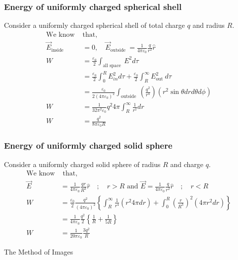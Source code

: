 \subsubsection{Energy of uniformly charged spherical shell}
Consider a uniformly charged spherical shell of total charge $q$ and radius $R$.
\begin{align*}
\text{We know }&\text{that,}\\
\vec{E}_{\text {inside }}&=0, \quad \vec{E}_{\text {outside }}=\frac{1}{4 \pi \varepsilon_{0}} \frac{q}{r^{2}} \hat{r}\\
W&=\frac{\varepsilon_{0}}{2} \int_{\text {all space }} E^{2} d \tau\\&=\frac{\varepsilon_{0}}{2} \int_{0}^{R} E_{i n}^{2} d \tau+\frac{\varepsilon_{0}}{2} \int_{R}^{\infty} E_{\text {out }}^{2} d \tau\\&=\frac{\varepsilon_{0}}{2\left(4 \pi \varepsilon_{0}\right)^{2}} \int_{\text {outside }}\left(\frac{q^{2}}{r^{4}}\right)\left(r^{2} \sin \theta d r d \theta d \phi\right) \\
W&=\frac{1}{32 \pi^{2} \varepsilon_{0}} q^{2} 4 \pi \int_{R}^{\infty} \frac{1}{r^{2}} d r\\ W&=\frac{q^{2}}{8 \pi \varepsilon_{0} R}
\end{align*}
\subsubsection{Energy of uniformly charged solid sphere}
Consider a uniformly charged solid sphere of radius $R$ and charge $q$.
\begin{align*}
\text{We know}&\text{ that,}\\
\vec{E}&=\frac{1}{4 \pi \varepsilon_{0}} \frac{q r}{R^{3}} \hat{r}\quad ; \quad r>R \text {  and  } \vec{E}=\frac{1}{4 \pi \varepsilon_{0}} \frac{q}{r^{2}} \hat{r}\quad ; \quad r<R \\
W&=\frac{\varepsilon_{0}}{2} \frac{q^{2}}{\left(4 \pi \varepsilon_{0}\right)^{2}}\left\{\int_{R}^{\infty} \frac{1}{r^{4}}\left(r^{2} 4 \pi d r\right)+\int_{0}^{R}\left(\frac{r}{R^{3}}\right)^{2}\left(4 \pi r^{2} d r\right)\right\}\\&=\frac{1}{4 \pi \varepsilon_{0}} \frac{q^{2}}{2}\left\{\frac{1}{R}+\frac{1}{5 R}\right\} \\
W&=\frac{1}{20\pi \varepsilon_{0}} \frac{3 q^{2}}{ R}
\end{align*}
\newpage 
\begin{abox}
	The Method of Images
\end{abox}
